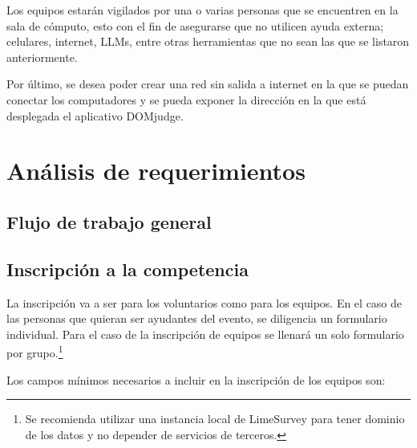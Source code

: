 \documentclass{article}
\begin{document}
Los equipos estarán vigilados por una o varias personas que se encuentren en la sala de cómputo, esto con el fin de asegurarse que no utilicen ayuda externa; celulares, internet, LLMs, entre otras herramientas que no sean las que se listaron anteriormente.

Por último, se desea poder crear una red sin salida a internet en la que se puedan conectar los computadores y se pueda exponer la dirección en la que está desplegada el aplicativo DOMjudge.


\section{Análisis de requerimientos}

\subsection{Flujo de trabajo general}


\subsection{Inscripción a la competencia}

La inscripción va a ser para los voluntarios como para los equipos. En el caso de las personas que quieran ser ayudantes del evento, se diligencia un formulario individual. Para el caso de la inscripción de equipos se llenará un solo formulario por grupo.\footnote{ Se recomienda utilizar una instancia local de LimeSurvey\cite{limesurvey} para tener dominio de los datos y no depender de servicios de terceros.}

Los campos mínimos necesarios a incluir en la inscripción de los equipos son:
\end{document}
